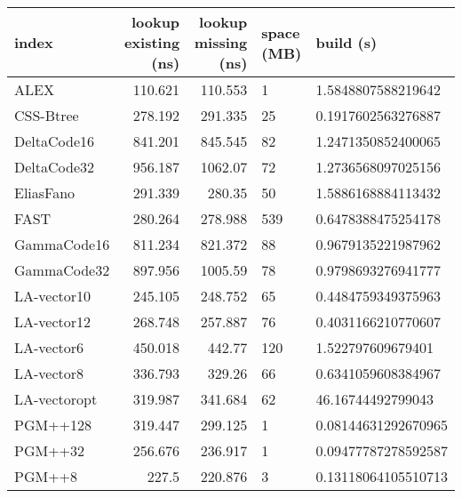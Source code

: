 \begin{tabular}{lrrll}
\hline
 index             &   lookup existing (ns) &   lookup missing (ns) & space (MB)   & build (s)             \\
\hline
 ALEX              &               110.621  &              110.553  & 1            & 1.5848807588219642    \\
 CSS-Btree         &               278.192  &              291.335  & 25           & 0.1917602563276887    \\
 DeltaCode16       &               841.201  &              845.545  & 82           & 1.2471350852400065    \\
 DeltaCode32       &               956.187  &             1062.07   & 72           & 1.2736568097025156    \\
 EliasFano         &               291.339  &              280.35   & 50           & 1.5886168884113432    \\
 FAST              &               280.264  &              278.988  & 539          & 0.6478388475254178    \\
 GammaCode16       &               811.234  &              821.372  & 88           & 0.9679135221987962    \\
 GammaCode32       &               897.956  &             1005.59   & 78           & 0.9798693276941777    \\
 LA-vector10       &               245.105  &              248.752  & 65           & 0.4484759349375963    \\
 LA-vector12       &               268.748  &              257.887  & 76           & 0.4031166210770607    \\
 LA-vector6        &               450.018  &              442.77   & 120          & 1.522797609679401     \\
 LA-vector8        &               336.793  &              329.26   & 66           & 0.6341059608384967    \\
 LA-vectoropt      &               319.987  &              341.684  & 62           & 46.16744492799043     \\
 PGM++128          &               319.447  &              299.125  & 1            & 0.08144631292670965   \\
 PGM++32           &               256.676  &              236.917  & 1            & 0.09477787278592587   \\
 PGM++8            &               227.5    &              220.876  & 3            & 0.13118064105510713   \\

\end{tabular}
